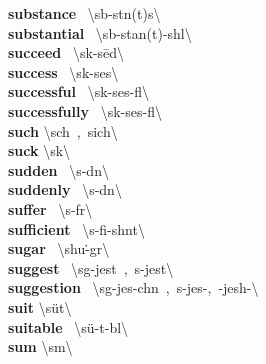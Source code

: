 \documentclass[10pt,a4paper]{article}
\begin{document}
\begin{multicols}{2}
\textbf{ substance }\quad \ \textbackslash \textprimstress s\textschwa b-st\textschwa n(t)s\textbackslash \\
\textbf{ substantial }\quad \ \textbackslash s\textschwa b-\textprimstress stan(t)-sh\textschwa l\textbackslash \\
\textbf{ succeed }\quad \ \textbackslash s\textschwa k-\textprimstress s\={e}d\textbackslash \\
\textbf{ success }\quad \ \textbackslash s\textschwa k-\textprimstress ses\textbackslash \\
\textbf{ successful }\quad \ \textbackslash s\textschwa k-\textprimstress ses-f\textschwa l\textbackslash \\
\textbf{ successfully }\quad \ \textbackslash s\textschwa k-\textprimstress ses-f\textschwa l\textbackslash \\
\textbf{ such }\quad \textbackslash \textprimstress s\textschwa ch\ ,\ \textprimstress sich\textbackslash \\
\textbf{ suck }\quad \textbackslash \textprimstress s\textschwa k\textbackslash \\
\textbf{ sudden }\quad \ \textbackslash \textprimstress s\textschwa -d\textsuperscript{\textreve}n\textbackslash \\
\textbf{ suddenly }\quad \ \textbackslash \textprimstress s\textschwa -d\textsuperscript{\textreve}n\textbackslash \\
\textbf{ suffer }\quad \ \textbackslash \textprimstress s\textschwa -f\textschwa r\textbackslash \\
\textbf{ sufficient }\quad \ \textbackslash s\textschwa -\textprimstress fi-sh\textschwa nt\textbackslash \\
\textbf{ sugar }\quad \ \textbackslash \textprimstress shu\. -g\textschwa r\textbackslash \\
\textbf{ suggest }\quad \ \textbackslash s\textschwa g-\textprimstress jest\ ,\ s\textschwa -\textprimstress jest\textbackslash \\
\textbf{ suggestion }\quad \ \textbackslash s\textschwa g-\textprimstress jes-ch\textschwa n\ ,\ s\textschwa -\textprimstress jes-,\ -\textprimstress jesh-\textbackslash \\
\textbf{ suit }\quad \textbackslash \textprimstress s\"{u}t\textbackslash \\
\textbf{ suitable }\quad \ \textbackslash \textprimstress s\"{u}-t\textschwa -b\textschwa l\textbackslash \\
\textbf{ sum }\quad \textbackslash \textprimstress s\textschwa m\textbackslash \\

\end{multicols}
\end{document}
